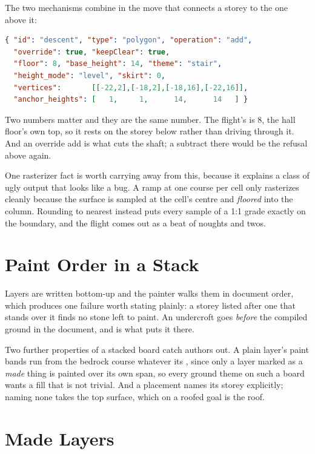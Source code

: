 The two mechanisms combine in the move that connects a storey to the one above it:

\begin{lstlisting}[language=json]
{ "id": "descent", "type": "polygon", "operation": "add",
  "override": true, "keepClear": true,
  "floor": 8, "base_height": 14, "theme": "stair",
  "height_mode": "level", "skirt": 0,
  "vertices":       [[-22,2],[-18,2],[-18,16],[-22,16]],
  "anchor_heights": [   1,     1,      14,      14   ] }
\end{lstlisting}

Two numbers matter and they are the same number. The flight's  is 8,
the hall floor's own top, so it rests on the storey below rather than driving
through it. And an override add is what cuts the shaft; a subtract there would be
the refusal above again.

One rasterizer fact is worth carrying away from this, because it explains a class
of ugly output that looks like a bug. A ramp at one course per cell only rasterizes
cleanly because the surface is sampled at the cell's centre and \emph{floored} into
the column. Rounding to nearest instead puts every sample of a 1:1 grade exactly on
the boundary, and the flight comes out as a beat of noughts and twos.

\section{Paint Order in a Stack}

Layers are written bottom-up and the painter walks them in document order, which
produces one failure worth stating plainly: a storey listed after one that stands
over it finds no stone left to paint. An undercroft goes \emph{before} the compiled
ground in the document, and  is what puts it there.

Two further properties of a stacked board catch authors out. A plain layer's paint
bands run from the bedrock course whatever its , since only a layer
marked as a \emph{made} thing is painted over its own span, so every ground theme
on such a board wants a fill that is not trivial. And a placement names its storey
explicitly; naming none takes the top surface, which on a roofed goal is the roof.

\section{Made Layers}

